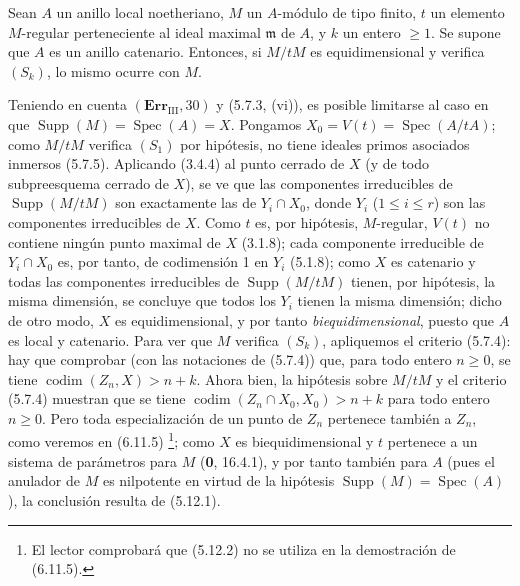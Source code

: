 \begin{proposition}[5.12.2]
\label{IV.2.s5.12.2-fr}
Sean $A$ un anillo local noetheriano, $M$ un $A$-módulo de tipo finito, $t$ un
elemento $M$-regular perteneciente al ideal maximal $\mathfrak m$ de $A$, y
$k$ un entero $\geq1$. Se supone que $A$ es un anillo catenario. Entonces, si
$M/tM$ es equidimensional y verifica $(S_k)$, lo mismo ocurre con $M$.
\end{proposition}

Teniendo en cuenta $(\mathbf{Err}_{\mathrm{III}},30)$ y (5.7.3, (vi)), es posible
limitarse al caso en que $\operatorname{Supp}(M)=\operatorname{Spec}(A)=X$.
Pongamos $X_0=V(t)=\operatorname{Spec}(A/tA)$; como $M/tM$ verifica $(S_1)$ por
hipótesis, no tiene ideales primos asociados inmersos (5.7.5). Aplicando (3.4.4)
al punto cerrado de $X$ (y de todo subpreesquema cerrado de $X$), se ve que las
componentes irreducibles de $\operatorname{Supp}(M/tM)$ son exactamente las de
$Y_i\cap X_0$, donde $Y_i$ ($1\leq i\leq r$) son las componentes irreducibles
de $X$. Como $t$ es, por hipótesis, $M$-regular, $V(t)$ no contiene ningún
punto maximal de $X$ (3.1.8); cada componente irreducible de $Y_i\cap X_0$ es,
por tanto, de codimensión 1 en $Y_i$ (5.1.8); como $X$ es catenario y todas las
componentes irreducibles de $\operatorname{Supp}(M/tM)$ tienen, por hipótesis,
la misma dimensión, se concluye que todos los $Y_i$ tienen la misma dimensión;
dicho de otro modo, $X$ es equidimensional, y por tanto \emph{biequidimensional},
puesto que $A$ es local y catenario. Para ver que $M$ verifica $(S_k)$,
apliquemos el criterio (5.7.4): hay que comprobar (con las notaciones de
(5.7.4)) que, para todo entero $n\geq0$, se tiene
$\operatorname{codim}(Z_n,X)>n+k$. Ahora bien, la hipótesis sobre $M/tM$ y el
criterio (5.7.4) muestran que se tiene
$\operatorname{codim}(Z_n\cap X_0,X_0)>n+k$ para todo entero $n\geq0$. Pero
toda especialización de un punto de $Z_n$ pertenece también a $Z_n$, como
veremos en (6.11.5)
\footnote{El lector comprobará que (5.12.2) no se utiliza en la demostración
de (6.11.5).}; como $X$ es biequidimensional y $t$ pertenece a un sistema de
parámetros para $M$ (\textbf 0, 16.4.1), y por tanto también para $A$ (pues el anulador
de $M$ es nilpotente en virtud de la hipótesis
$\operatorname{Supp}(M)=\operatorname{Spec}(A)$), la conclusión resulta de
(5.12.1).

